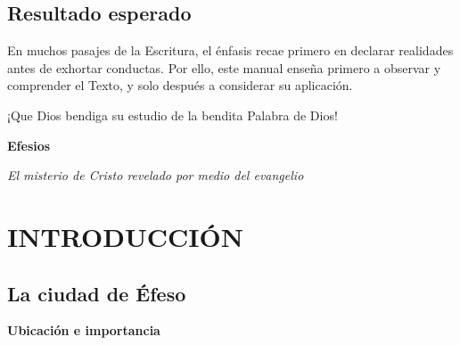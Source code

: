 \documentclass[11pt]{article}
\begin{document}
\subsection{Resultado esperado}\label{resultado-esperado}

\begin{paraHfour}
En muchos pasajes de la Escritura, el énfasis recae primero en declarar realidades antes de exhortar conductas. Por ello, este manual enseña primero a observar y comprender el Texto, y solo después a considerar su aplicación.
\end{paraHfour}

\begin{paraHfour}
¡Que Dios bendiga su estudio de la bendita Palabra de Dios!
\end{paraHfour}

\clearpage

\setcounter{tocdepth}{1}
\tableofcontents
\clearpage

\newpage
\begin{center}
  {\Huge\bfseries Efesios}
\end{center}

\vspace{-0.8em}
\begin{center}
  {\large\itshape El misterio de Cristo revelado por medio del evangelio}
\end{center}

\section{INTRODUCCIÓN}\label{introducciuxf3n}

\subsection{La ciudad de Éfeso}\label{la-ciudad-de-uxe9feso}

\begin{paraHtwo}\textbf{Ubicación e importancia}\end{paraHtwo}


\end{document}
